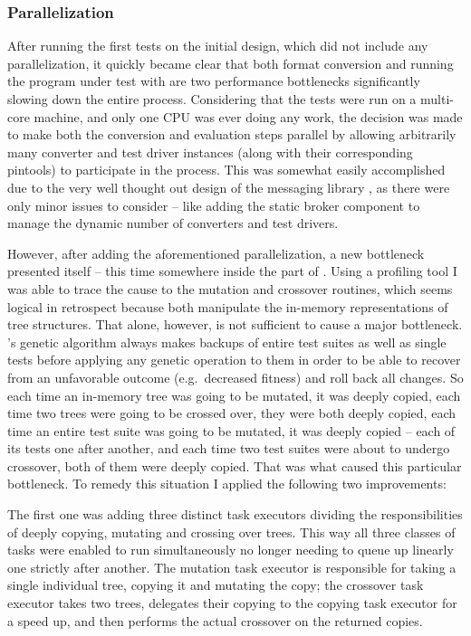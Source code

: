 \subsubsection{Parallelization}
\label{sec:par}
After running the first tests on the initial \xmlmate design, which did not include any parallelization, 
it quickly became clear that both format conversion and running the program under test with \pin 
are two performance bottlenecks significantly slowing down the entire process. Considering that the 
tests were run on a multi-core machine, and only one CPU was ever doing any work, the decision was 
made to make both the conversion and evaluation steps parallel by allowing arbitrarily many 
converter and test driver instances (along with their corresponding pintools) to participate in the process. 
This was somewhat easily accomplished due to the very well thought out design of the messaging library \zmq, 
as there were only minor issues to consider -- like adding the static broker component to 
manage the dynamic number of converters and test drivers.

However, after adding the aforementioned parallelization, a new bottleneck presented itself -- this time 
somewhere inside the \java part of \xmlmate. Using a \java profiling tool I was able to trace the cause 
to the mutation and crossover routines, which seems logical in retrospect because both manipulate the 
in-memory representations of \xml tree structures. That alone, however, is not sufficient to cause a 
major bottleneck. \evosuite's genetic algorithm always makes backups of entire test suites as well as 
single tests before applying any genetic operation to them in order to be able to recover from an 
unfavorable outcome (e.g.\ decreased fitness) and roll back all changes. So each time an in-memory \xml 
tree was going to be mutated, it was deeply copied, each time two \xml trees were going to be crossed 
over, they were both deeply copied, each time an entire test suite was going to be mutated, it was 
deeply copied -- each of its tests one after another, and each time two test suites were about to 
undergo crossover, both of them were deeply copied. That was what caused this particular bottleneck. 
To remedy this situation I applied the following two improvements:

The first one was adding three distinct task executors dividing the responsibilities of deeply copying, mutating and 
crossing over \xml trees. This way all three classes of tasks were enabled to run simultaneously 
no longer needing to queue up linearly one strictly after another. The mutation task executor is 
responsible for taking a single individual \xml tree, copying it and mutating the copy; the 
crossover task executor takes two \xml trees, delegates their copying to the copying task executor 
for a speed up, and then performs the actual crossover on the returned copies.

